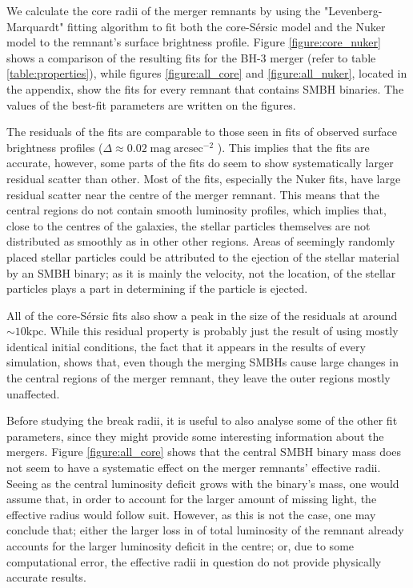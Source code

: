 \documentclass[english, oneside]{HYgradu}
\begin{document}
We calculate the core radii of the merger remnants by using the "Levenberg-Marquardt" fitting algorithm to fit both the core-Sérsic model and the Nuker model to the remnant's surface brightness profile. Figure \ref{figure:core_nuker} shows a comparison of the resulting fits for the BH-3 merger (refer to table \ref{table:properties}), while figures \ref{figure:all_core} and \ref{figure:all_nuker}, located in the appendix, show the fits for every remnant that contains SMBH binaries. The values of the best-fit parameters are written on the figures.

The residuals of the fits are comparable to those seen in fits of observed surface brightness profiles ($\Delta \approx 0.02 \; \mathrm{mag \; arcsec^{-2}}$ \citep{Dullo2012}). This implies that the fits are accurate, however, some parts of the fits do seem to show systematically larger residual scatter than other. Most of the fits, especially the Nuker fits, have large residual scatter near the centre of the merger remnant. This means that the central regions do not contain smooth luminosity profiles, which implies that, close to the centres of the galaxies, the stellar particles themselves are not distributed as smoothly as in other other regions. Areas of seemingly randomly placed stellar particles could be attributed to the ejection of the stellar material by an SMBH binary; as it is mainly the velocity, not the location, of the stellar particles plays a part in determining if the particle is ejected.  

All of the core-Sérsic fits also show a peak in the size of the residuals at around $\sim 10 \mathrm{kpc}$. While this residual property is probably just the result of using mostly identical initial conditions, the fact that it appears in the results of every simulation, shows that, even though the merging SMBHs cause large changes in the central regions of the merger remnant, they leave the outer regions mostly unaffected.

Before studying the break radii, it is useful to also analyse some of the other fit parameters, since they might provide some interesting information about the mergers. Figure \ref{figure:all_core} shows that the central SMBH binary mass does not seem to have a systematic effect on the merger remnants' effective radii. Seeing as the central luminosity deficit grows with the binary's mass, one would assume that, in order to account for the larger amount of missing light, the effective radius would follow suit. However, as this is not the case, one may conclude that; either the larger loss in of total luminosity of the remnant already accounts for the larger luminosity deficit in the centre; or, due to some computational error, the effective radii in question do not provide physically accurate results.
\end{document}
